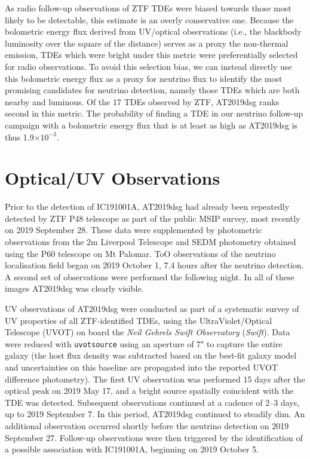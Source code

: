 \documentclass{nature_plusfigure}
\begin{document}
\begin{methods}
As radio follow-up observations of ZTF TDEs were biased towards those most likely to be detectable, this estimate is an overly conservative one. Because the bolometric energy flux derived from UV/optical observations (i.e., the blackbody luminosity over the square of the distance) serves as a proxy the non-thermal emission, TDEs which were bright under this metric were preferentially selected for radio observations. To avoid this selection bias, we can instead directly use this bolometric energy flux  as a proxy for neutrino flux to identify the most promising candidates for neutrino detection, namely those TDEs which are both nearby and luminous. Of the 17 TDEs observed by ZTF, AT2019dsg ranks second in this metric. The probability of finding a TDE in our neutrino follow-up campaign with a bolometric energy flux that is at least as high as AT2019dsg is thus 1.9$ \times 10^{-3}$. 

\section{Optical/UV Observations}
Prior to the detection of IC191001A, AT2019dsg had already been repeatedly detected by ZTF P48 telescope as part of the public MSIP survey, most recently on 2019 September 28. These data were supplemented by photometric observations from the 2m Liverpool Telescope\cite{2004SPIE.5489..679S} and SEDM\cite{Blagorodnova18,Rigault19} photometry\cite{fst+2016} obtained using the P60 telescope on Mt Palomar. ToO observations of the neutrino localisation field began on 2019 October 1, 7.4 hours after the neutrino detection. A second set of observations were performed the following night. In all of these images AT2019dsg was clearly visible. 

UV observations of AT2019dsg were conducted as part of a systematic survey of UV properties of all ZTF-identified TDEs\cite{2018ApJ...852...72V}, using the UltraViolet/Optical Telescope\cite{2005SSRv..120...95R} (UVOT) on board the \textit{Neil Gehrels Swift Observatory} (\textit{Swift})\cite{2004ApJ...611.1005G}. Data were reduced with \texttt{uvotsource} using an aperture of 7" to capture the entire galaxy (the host flux density was subtracted based on the best-fit galaxy model\cite{2018ApJ...852...72V} and uncertainties on this baseline are propagated into the reported UVOT difference photometry). The first UV observation was performed 15 days after the optical peak on 2019 May 17, and a bright source spatially coincident with the TDE was detected. Subsequent observations continued at a cadence of 2--3 days, up to 2019 September 7. In this period, AT2019dsg continued to steadily dim. An additional observation occurred shortly before the neutrino detection on 2019 September 27. Follow-up observations were then triggered by the identification of a possible association with IC191001A\cite{2019ATel13160....1S}, beginning on 2019 October 5. 


\end{methods}
\end{document}
